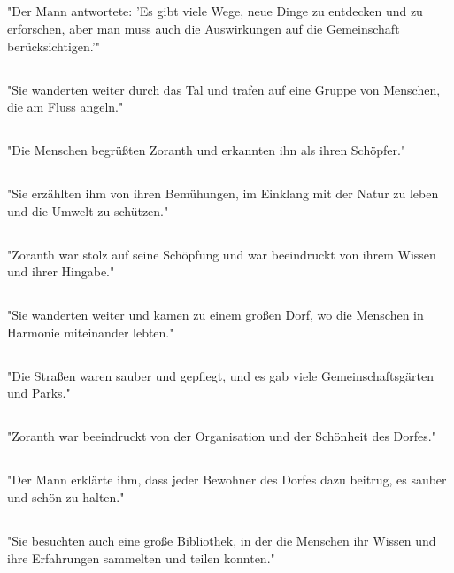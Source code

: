 \documentclass{article}
\begin{document}
\subsection{}
"Der Mann antwortete: 'Es gibt viele Wege, neue Dinge zu entdecken und zu erforschen, aber man muss auch die Auswirkungen auf die Gemeinschaft berücksichtigen.'"
\subsection{}
"Sie wanderten weiter durch das Tal und trafen auf eine Gruppe von Menschen, die am Fluss angeln."
\subsection{}
"Die Menschen begrüßten Zoranth und erkannten ihn als ihren Schöpfer."
\subsection{}
"Sie erzählten ihm von ihren Bemühungen, im Einklang mit der Natur zu leben und die Umwelt zu schützen."
\subsection{}
"Zoranth war stolz auf seine Schöpfung und war beeindruckt von ihrem Wissen und ihrer Hingabe."
\subsection{}
"Sie wanderten weiter und kamen zu einem großen Dorf, wo die Menschen in Harmonie miteinander lebten."
\subsection{}
"Die Straßen waren sauber und gepflegt, und es gab viele Gemeinschaftsgärten und Parks."
\subsection{}
"Zoranth war beeindruckt von der Organisation und der Schönheit des Dorfes."
\subsection{}
"Der Mann erklärte ihm, dass jeder Bewohner des Dorfes dazu beitrug, es sauber und schön zu halten."
\subsection{}
"Sie besuchten auch eine große Bibliothek, in der die Menschen ihr Wissen und ihre Erfahrungen sammelten und teilen konnten."
\end{document}
